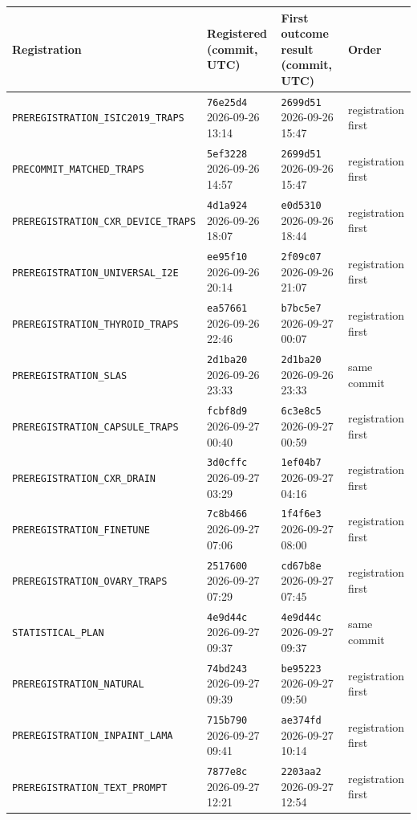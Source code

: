 \begin{center}\scriptsize
\begin{tabular}{llll}\toprule
Registration & Registered (commit, UTC) & First outcome result (commit, UTC) & Order \\\midrule
\texttt{PREREGISTRATION\_ISIC2019\_TRAPS} & \texttt{76e25d4} 2026-09-26 13:14 & \texttt{2699d51} 2026-09-26 15:47 & registration first \\
\texttt{PRECOMMIT\_MATCHED\_TRAPS} & \texttt{5ef3228} 2026-09-26 14:57 & \texttt{2699d51} 2026-09-26 15:47 & registration first \\
\texttt{PREREGISTRATION\_CXR\_DEVICE\_TRAPS} & \texttt{4d1a924} 2026-09-26 18:07 & \texttt{e0d5310} 2026-09-26 18:44 & registration first \\
\texttt{PREREGISTRATION\_UNIVERSAL\_I2E} & \texttt{ee95f10} 2026-09-26 20:14 & \texttt{2f09c07} 2026-09-26 21:07 & registration first \\
\texttt{PREREGISTRATION\_THYROID\_TRAPS} & \texttt{ea57661} 2026-09-26 22:46 & \texttt{b7bc5e7} 2026-09-27 00:07 & registration first \\
\texttt{PREREGISTRATION\_SLAS} & \texttt{2d1ba20} 2026-09-26 23:33 & \texttt{2d1ba20} 2026-09-26 23:33 & same commit \\
\texttt{PREREGISTRATION\_CAPSULE\_TRAPS} & \texttt{fcbf8d9} 2026-09-27 00:40 & \texttt{6c3e8c5} 2026-09-27 00:59 & registration first \\
\texttt{PREREGISTRATION\_CXR\_DRAIN} & \texttt{3d0cffc} 2026-09-27 03:29 & \texttt{1ef04b7} 2026-09-27 04:16 & registration first \\
\texttt{PREREGISTRATION\_FINETUNE} & \texttt{7c8b466} 2026-09-27 07:06 & \texttt{1f4f6e3} 2026-09-27 08:00 & registration first \\
\texttt{PREREGISTRATION\_OVARY\_TRAPS} & \texttt{2517600} 2026-09-27 07:29 & \texttt{cd67b8e} 2026-09-27 07:45 & registration first \\
\texttt{STATISTICAL\_PLAN} & \texttt{4e9d44c} 2026-09-27 09:37 & \texttt{4e9d44c} 2026-09-27 09:37 & same commit \\
\texttt{PREREGISTRATION\_NATURAL} & \texttt{74bd243} 2026-09-27 09:39 & \texttt{be95223} 2026-09-27 09:50 & registration first \\
\texttt{PREREGISTRATION\_INPAINT\_LAMA} & \texttt{715b790} 2026-09-27 09:41 & \texttt{ae374fd} 2026-09-27 10:14 & registration first \\
\texttt{PREREGISTRATION\_TEXT\_PROMPT} & \texttt{7877e8c} 2026-09-27 12:21 & \texttt{2203aa2} 2026-09-27 12:54 & registration first \\

\end{tabular}
\end{center}
